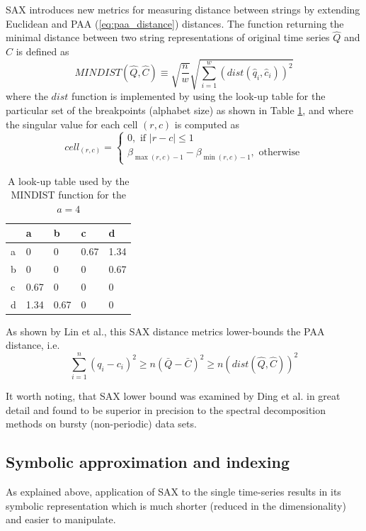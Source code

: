 \documentclass[conference]{worldcomp}
\begin{document}
SAX introduces new metrics for measuring distance between strings by extending Euclidean and PAA (\ref{eq:paa_distance}) distances. 
The function returning the minimal distance between two string representations of original
 time series $\hat{Q}$ and $\hat{C}$ is defined as
\begin{equation}
MINDIST(\hat{Q},\hat{C}) \equiv \sqrt{ \frac{n}{w} } \sqrt{ \sum_{i=1}^{w} ( dist( \hat{q}_{i}, \hat{c}_{i} ) )^{2}}
\label{eq:sax_mindist}
\end{equation} 
where the $dist$ function is implemented by using the look-up table for the particular set of the breakpoints 
(alphabet size) as shown in Table \ref{tbl:sax_lookup}, and where the singular value for each cell $(r,c)$ 
is computed as 
\begin{equation}
cell_{(r,c)} = 
\begin{cases} 
0, \text{ if }\left| r-c \right| \leq 1 \\
\beta_{\max(r,c) - 1} - \beta_{\min(r,c) - 1}, \text{ otherwise}
\end{cases}
\label{eq:cell}
\end{equation}

\begin{table}
\begin{tabularx}{240pt}{X X X X X}
\hline
   & a   & b    & c    & d    \\
\hline
a & 0    & 0    & 0.67 & 1.34 \\
b & 0    & 0    & 0    & 0.67 \\
c & 0.67 & 0    & 0    & 0    \\
d & 1.34 & 0.67 & 0    & 0    \\
\hline
\end{tabularx}
\caption{A look-up table used by the MINDIST function for the $a=4$}
\label{tbl:sax_lookup}
\end{table}

As shown by Lin et al., this SAX distance metrics lower-bounds the PAA distance, i.e.
\begin{equation}
\sum_{i=1}^{n} (q_{i} - c_{i})^{2} \geq n(\bar{Q} - \bar{C})^{2} \geq n(dist(\hat{Q},\hat{C}))^2
\label{eq:sax_bounding}
\end{equation}

It worth noting, that SAX lower bound was examined by Ding et al. \cite{citeulike:4501572} in 
great detail and found to be superior in precision to the spectral decomposition methods 
on bursty (non-periodic) data sets.

\subsection{Symbolic approximation and indexing}
As explained above, application of SAX to the single time-series results in its symbolic 
representation which is much shorter (reduced in the dimensionality) and easier to manipulate. 
\end{document}
